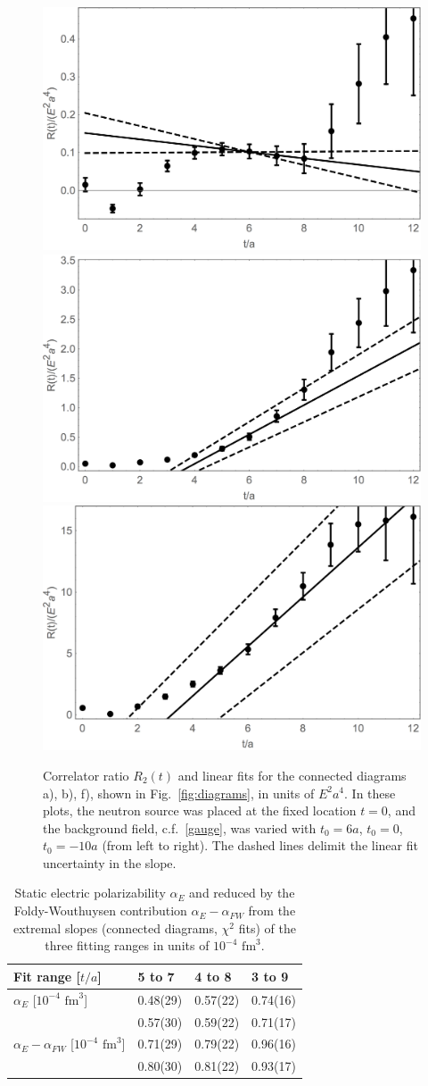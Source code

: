 \begin{figure}[H]
\centering
\includegraphics[width=.33\linewidth]{figures/shshLineCS.png}
\includegraphics[width=.33\linewidth]{figures/from0LineCS.png}
\includegraphics[width=.325\linewidth]{figures/shortLineCS.png}\\
\caption{Correlator ratio $R_2(t)$ and linear fits for the connected diagrams a), b), f), shown in Fig.~\ref{fig:diagrams}, in units of $E^2a^4$. In these plots, the neutron source was placed at the fixed location $t=0$, and the background field, c.f.~\ref{gauge}, was varied with $t_0=6a$, $t_0=0$, $t_0=-10a$ (from left to right). The dashed lines delimit the linear fit uncertainty in the slope.}
\label{fig: alphaconnected}
\end{figure}

\begin{table}[H]
\begin{center}
    \begin{tabular}{|l|l|l|l|}
    \hline
     Fit range [$t/a$] 					& 5 to 7 		&  4 to 8 		&  3 to 9 \\ \hline
     $\alpha_E$ [$10^{-4}$ $\text{fm}^3$]  	&  0.48(29)      	&  0.57(22)     	& 0.74(16)       \\
								& 0.57(30)		&  0.59(22)	& 0.71(17)		\\ \hline 
     $\alpha_E-\alpha_{FW}$ [$10^{-4}$ $\text{fm}^3$]  	& 0.71(29)   	& 0.79(22)   	&  0.96(16) \\ 
     											& 0.80(30)		& 0.81(22)		& 0.93(17) \\ \hline
    \end{tabular}
\end{center}
\caption{Static electric polarizability  $\alpha_E$ and reduced by the Foldy-Wouthuysen contribution $\alpha_E-\alpha_{FW}$ from the extremal slopes (connected diagrams, $\chi^2$ fits) of the three fitting ranges in units of $10^{-4}$ $\text{fm}^3$. }
\label{tab:ConnectedPolarizabilities}
\end{table}




